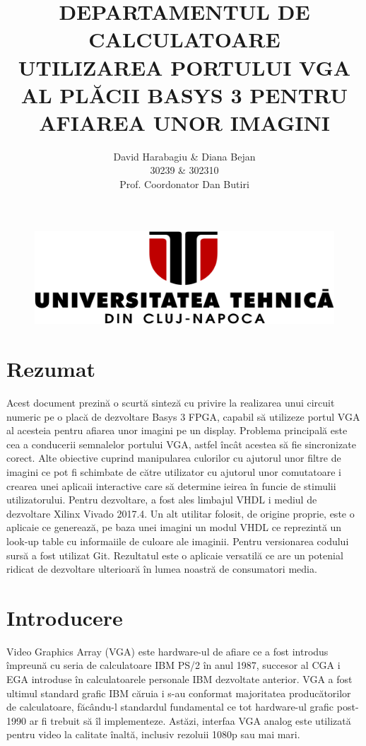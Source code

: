 \documentclass[a4paper,11pt,romanian]{article}
\author{David Harabagiu \& Diana Bejan\\30239 \& 302310\\Prof. Coordonator Dan Butiri}
\title{\uppercase{\textbf{Departamentul de calculatoare} \vspace{20.0pt} \\ utilizarea portului vga al pl\u{a}cii basys 3 pentru afi\cb{s}area unor imagini}}
\begin{document}
\begin{figure}
  \begin{center}
   \includegraphics[scale=0.1]{utcn.png}
   \label{fig:utcnlogo}
  \end{center}
 \end{figure}
\maketitle
\newpage
\tableofcontents
\newpage

\section{Rezumat}

Acest document prezin\u{a} o scurt\u{a} sintez\u{a} cu privire la realizarea unui circuit numeric pe o plac\u{a} de dezvoltare Basys 3 FPGA, capabil s\u{a} utilizeze portul VGA al acesteia pentru afiarea unor imagini pe un display.
Problema principal\u{a} este cea a conducerii semnalelor portului VGA, astfel \^{i}nc\^{a}t acestea s\u{a} fie sincronizate corect.
Alte obiective cuprind manipularea culorilor cu ajutorul unor filtre de imagini ce pot fi schimbate de c\u{a}tre utilizator cu ajutorul unor comutatoare i crearea unei aplicaii interactive care s\u{a} determine ieirea \^{i}n funcie de stimulii utilizatorului.
Pentru dezvoltare, a fost ales limbajul VHDL i mediul de dezvoltare Xilinx Vivado 2017.4. Un alt utilitar folosit, de origine proprie, este o aplicaie ce genereaz\u{a}, pe baza unei imagini un modul VHDL ce reprezint\u{a} un look-up table cu informaiile de culoare ale imaginii.
Pentru versionarea codului surs\u{a} a fost utilizat Git.
Rezultatul este o aplicaie versatil\u{a} ce are un potenial ridicat de dezvoltare ulterioar\u{a} \^{i}n lumea noastr\u{a} de consumatori media.

\newpage

\section{Introducere}
Video Graphics Array (VGA) este hardware-ul de afiare ce a fost introdus \^{i}mpreun\u{a} cu seria de calculatoare IBM PS/2 \^{i}n anul 1987, succesor al CGA i EGA introduse \^{i}n calculatoarele personale IBM dezvoltate anterior. VGA a fost ultimul standard grafic IBM c\u{a}ruia i s-au conformat majoritatea produc\u{a}torilor de calculatoare, f\u{a}c\^{a}ndu-l standardul fundamental ce tot hardware-ul grafic post-1990 ar fi trebuit s\u{a} \^{i}l implementeze. Ast\u{a}zi, interfaa VGA analog este utilizat\u{a} pentru video la calitate \^{i}nalt\u{a}, inclusiv rezoluii 1080p sau mai mari. ~\cite{wiki:vga}
\end{document}
